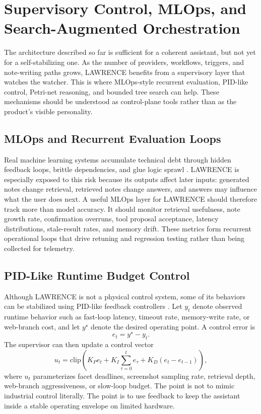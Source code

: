 \documentclass[conference]{IEEEtran}
\begin{document}
\section{Supervisory Control, MLOps, and Search-Augmented Orchestration}
The architecture described so far is sufficient for a coherent assistant, but not yet for a self-stabilizing one. As the number of providers, workflows, triggers, and note-writing paths grows, LAWRENCE benefits from a supervisory layer that watches the watcher. This is where MLOps-style recurrent evaluation, PID-like control, Petri-net reasoning, and bounded tree search can help. These mechanisms should be understood as control-plane tools rather than as the product's visible personality.

\subsection{MLOps and Recurrent Evaluation Loops}
Real machine learning systems accumulate technical debt through hidden feedback loops, brittle dependencies, and glue logic sprawl \cite{sculley2015debt}. LAWRENCE is especially exposed to this risk because its outputs affect later inputs: generated notes change retrieval, retrieved notes change answers, and answers may influence what the user does next. A useful MLOps layer for LAWRENCE should therefore track more than model accuracy. It should monitor retrieval usefulness, note growth rate, confirmation overruns, tool proposal acceptance, latency distributions, stale-result rates, and memory drift. These metrics form recurrent operational loops that drive retuning and regression testing rather than being collected for telemetry.

\subsection{PID-Like Runtime Budget Control}
Although LAWRENCE is not a physical control system, some of its behaviors can be stabilized using PID-like feedback controllers \cite{astrom1995pid}. Let $y_t$ denote observed runtime behavior such as fast-loop latency, timeout rate, memory-write rate, or web-branch cost, and let $y^\star$ denote the desired operating point. A control error is
\begin{equation}
e_t = y^\star - y_t.
\end{equation}
The supervisor can then update a control vector
\begin{equation}
\label{eq:pid}
u_t = \mathrm{clip}\left(
K_P e_t +
K_I \sum_{\tau=0}^{t} e_\tau +
K_D (e_t - e_{t-1})
\right),
\end{equation}
where $u_t$ parameterizes facet deadlines, screenshot sampling rate, retrieval depth, web-branch aggressiveness, or slow-loop budget. The point is not to mimic industrial control literally. The point is to use feedback to keep the assistant inside a stable operating envelope on limited hardware.
\end{document}
